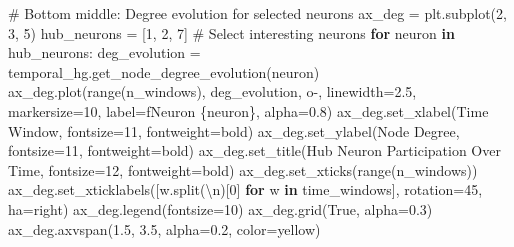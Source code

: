 \documentclass[
  11pt,
  letterpaper,
  oneside,
  openany]{book}
\newenvironment{Shaded}{\begin{snugshade}}{\end{snugshade}}
\newcommand{\BuiltInTok}[1]{\textcolor[rgb]{0.00,0.23,0.31}{#1}}
\newcommand{\CharTok}[1]{\textcolor[rgb]{0.13,0.47,0.30}{#1}}
\newcommand{\CommentTok}[1]{\textcolor[rgb]{0.37,0.37,0.37}{#1}}
\newcommand{\ControlFlowTok}[1]{\textcolor[rgb]{0.00,0.23,0.31}{\textbf{#1}}}
\newcommand{\DecValTok}[1]{\textcolor[rgb]{0.68,0.00,0.00}{#1}}
\newcommand{\FloatTok}[1]{\textcolor[rgb]{0.68,0.00,0.00}{#1}}
\newcommand{\KeywordTok}[1]{\textcolor[rgb]{0.00,0.23,0.31}{\textbf{#1}}}
\newcommand{\NormalTok}[1]{\textcolor[rgb]{0.00,0.23,0.31}{#1}}
\newcommand{\OperatorTok}[1]{\textcolor[rgb]{0.37,0.37,0.37}{#1}}
\newcommand{\SpecialCharTok}[1]{\textcolor[rgb]{0.37,0.37,0.37}{#1}}
\newcommand{\SpecialStringTok}[1]{\textcolor[rgb]{0.13,0.47,0.30}{#1}}
\newcommand{\StringTok}[1]{\textcolor[rgb]{0.13,0.47,0.30}{#1}}
\newcommand{\VariableTok}[1]{\textcolor[rgb]{0.07,0.07,0.07}{#1}}
\begin{document}
\begin{Shaded}
\begin{Highlighting}[]
\CommentTok{\# Bottom middle: Degree evolution for selected neurons}
\NormalTok{ax\_deg }\OperatorTok{=}\NormalTok{ plt.subplot(}\DecValTok{2}\NormalTok{, }\DecValTok{3}\NormalTok{, }\DecValTok{5}\NormalTok{)}
\NormalTok{hub\_neurons }\OperatorTok{=}\NormalTok{ [}\DecValTok{1}\NormalTok{, }\DecValTok{2}\NormalTok{, }\DecValTok{7}\NormalTok{]  }\CommentTok{\# Select interesting neurons}
\ControlFlowTok{for}\NormalTok{ neuron }\KeywordTok{in}\NormalTok{ hub\_neurons:}
\NormalTok{    deg\_evolution }\OperatorTok{=}\NormalTok{ temporal\_hg.get\_node\_degree\_evolution(neuron)}
\NormalTok{    ax\_deg.plot(}\BuiltInTok{range}\NormalTok{(n\_windows), deg\_evolution, }\StringTok{\textquotesingle{}o{-}\textquotesingle{}}\NormalTok{, linewidth}\OperatorTok{=}\FloatTok{2.5}\NormalTok{,}
\NormalTok{               markersize}\OperatorTok{=}\DecValTok{10}\NormalTok{, label}\OperatorTok{=}\SpecialStringTok{f\textquotesingle{}Neuron }\SpecialCharTok{\{}\NormalTok{neuron}\SpecialCharTok{\}}\SpecialStringTok{\textquotesingle{}}\NormalTok{, alpha}\OperatorTok{=}\FloatTok{0.8}\NormalTok{)}
\NormalTok{ax\_deg.set\_xlabel(}\StringTok{\textquotesingle{}Time Window\textquotesingle{}}\NormalTok{, fontsize}\OperatorTok{=}\DecValTok{11}\NormalTok{, fontweight}\OperatorTok{=}\StringTok{\textquotesingle{}bold\textquotesingle{}}\NormalTok{)}
\NormalTok{ax\_deg.set\_ylabel(}\StringTok{\textquotesingle{}Node Degree\textquotesingle{}}\NormalTok{, fontsize}\OperatorTok{=}\DecValTok{11}\NormalTok{, fontweight}\OperatorTok{=}\StringTok{\textquotesingle{}bold\textquotesingle{}}\NormalTok{)}
\NormalTok{ax\_deg.set\_title(}\StringTok{\textquotesingle{}Hub Neuron Participation Over Time\textquotesingle{}}\NormalTok{, fontsize}\OperatorTok{=}\DecValTok{12}\NormalTok{, fontweight}\OperatorTok{=}\StringTok{\textquotesingle{}bold\textquotesingle{}}\NormalTok{)}
\NormalTok{ax\_deg.set\_xticks(}\BuiltInTok{range}\NormalTok{(n\_windows))}
\NormalTok{ax\_deg.set\_xticklabels([w.split(}\StringTok{\textquotesingle{}}\CharTok{\textbackslash{}n}\StringTok{\textquotesingle{}}\NormalTok{)[}\DecValTok{0}\NormalTok{] }\ControlFlowTok{for}\NormalTok{ w }\KeywordTok{in}\NormalTok{ time\_windows], }
\NormalTok{                       rotation}\OperatorTok{=}\DecValTok{45}\NormalTok{, ha}\OperatorTok{=}\StringTok{\textquotesingle{}right\textquotesingle{}}\NormalTok{)}
\NormalTok{ax\_deg.legend(fontsize}\OperatorTok{=}\DecValTok{10}\NormalTok{)}
\NormalTok{ax\_deg.grid(}\VariableTok{True}\NormalTok{, alpha}\OperatorTok{=}\FloatTok{0.3}\NormalTok{)}
\NormalTok{ax\_deg.axvspan(}\FloatTok{1.5}\NormalTok{, }\FloatTok{3.5}\NormalTok{, alpha}\OperatorTok{=}\FloatTok{0.2}\NormalTok{, color}\OperatorTok{=}\StringTok{\textquotesingle{}yellow\textquotesingle{}}\NormalTok{)}


\end{Highlighting}
\end{Shaded}
\end{document}
